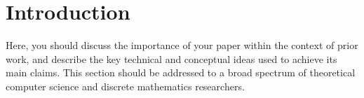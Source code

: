 \section{Introduction} \label{sec:introduction}

Here, you should discuss the importance of your paper within the context of prior work, and describe the key technical and conceptual ideas used to achieve its main claims. This section should be addressed to a broad spectrum of theoretical computer science and discrete mathematics researchers.
